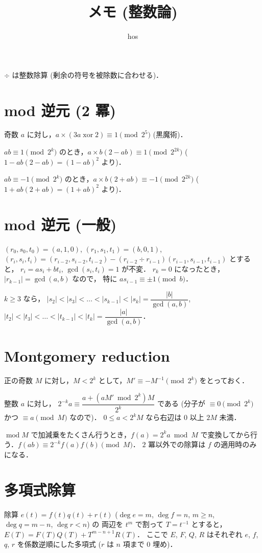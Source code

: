 \documentclass{jsarticle}
\title{メモ (整数論)}
\author{hos}
\DeclareMathOperator{\Mod}{mod}
\DeclareMathOperator{\xor}{xor}
\begin{document}
\maketitle

$\div$ は整数除算 (剰余の符号を被除数に合わせる)．

\section{mod 逆元 (2 冪)}
奇数 $a$ に対し，$a \times (3a \xor 2) \equiv 1 \pmod{2^5}$ (黒魔術)．

$a b \equiv 1 \pmod{2^k}$ のとき，$a \times b (2 - a b) \equiv 1 \pmod{2^{2k}}$ ($1 - a b (2 - a b) = (1 - a b)^2$ より)．

$a b \equiv -1 \pmod{2^k}$ のとき，$a \times b (2 + a b) \equiv -1 \pmod{2^{2k}}$ ($1 + a b (2 + a b) = (1 + a b)^2$ より)．

\section{mod 逆元 (一般)}
$(r_0, s_0, t_0) = (a, 1, 0)$, 
$(r_1, s_1, t_1) = (b, 0, 1)$, 
$(r_i, s_i, t_i) = (r_{i-2}, s_{i-2}, t_{i-2}) - (r_{i-2} \div r_{i-1}) (r_{i-1}, s_{i-1}, t_{i-1})$ とすると，
$r_i = a s_i + b t_i$, $\gcd(s_i, t_i) = 1$ が不変．
$r_k = 0$ になったとき，$\lvert r_{k-1} \rvert = \gcd(a, b)$ なので，
特に $a s_{i-1} \equiv \pm 1 \pmod{b}$．

$k \ge 3$ なら，
$|s_2| < |s_3| < \dots < |s_{k-1}| < |s_k| = \dfrac{\lvert b \rvert}{\gcd(a, b)}$, 
$|t_2| < |t_3| < \dots < |t_{k-1}| < |t_k| = \dfrac{\lvert a \rvert}{\gcd(a, b)}$．

\section{Montgomery reduction}
正の奇数 $M$ に対し，$M < 2^k$ として，$M' \equiv -M^{-1} \pmod{2^k}$ をとっておく．

整数 $a$ に対し，
$2^{-k} a \equiv \dfrac{a + (a M' \bmod 2^k) M}{2^k}$ である (分子が $\equiv 0 \pmod{2^k}$ かつ $\equiv a \pmod{M}$ なので)．
$0 \le a < 2^k M$ なら右辺は $0$ 以上 $2 M$ 未満．

$\Mod M$ で加減乗をたくさん行うとき，$f(a) = 2^k a \bmod M$ で変換してから行う．$f(a b) \equiv 2^{-k} f(a) f(b) \pmod{M}$．
$2$ 冪以外での除算は $f$ の適用時のみになる．

\section{多項式除算}
除算 $e(t) = f(t) q(t) + r(t)$ ($\deg e = m$, $\deg f = n$, $m \ge n$, $\deg q = m - n$, $\deg r < n$) の
両辺を $t^m$ で割って $T = t^{-1}$ とすると，
$E(T) = F(T) Q(T) + T^{m-n+1} R(T)$．
ここで $E$, $F$, $Q$, $R$ はそれぞれ $e$, $f$, $q$, $r$ を係数逆順にした多項式 ($r$ は $n$ 項まで $0$ 埋め)．
\end{document}
